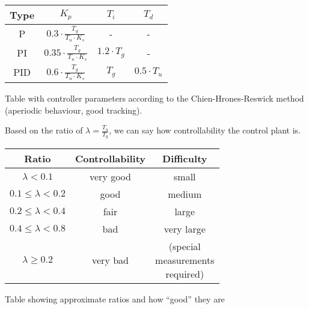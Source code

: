 \begin{center}
    \begin{threeparttable}
        \begin{tabular}{cccc}
            \toprule
            Type & $K_p$                                    &  $T_{i}$            &  $T_{d}$ \\
            \midrule
            P    &  $0.3   \cdot\frac{T_g}{T_u \cdot K_s}$  &  -                  &  -                  \\
            PI   &  $0.35  \cdot\frac{T_g}{T_u \cdot K_s}$  &  $1.2 \cdot T_g$    &  -                  \\
            PID  &  $0.6   \cdot\frac{T_g}{T_u \cdot K_s}$  &  $T_g$              &  $0.5 \cdot T_u$    \\
            \bottomrule
        \end{tabular}
        \caption{Table with controller parameters according to the Chien-Hrones-Reswick method (aperiodic behaviour, good tracking).}
        \label{tab:CHR_tracking}
    \end{threeparttable}
\end{center}

Based  on  the  ratio   of   $\lambda=\frac{T_{u}}{T_{g}}$,  we  can  say  how
controllability the control plant is.

\begin{center}
    \begin{threeparttable}
        \begin{tabular}{ccc}
            \toprule
            Ratio                     &  Controllability  & Difficulty \\
            \midrule
            $\lambda < 0.1$           &  very good        & small  \\ 
            $0.1 \leq \lambda < 0.2$  &  good             & medium  \\ 
            $0.2 \leq \lambda < 0.4$  &  fair             & large  \\ 
            $0.4 \leq \lambda < 0.8$  &  bad              & very large  \\ 
            $ \lambda \geq 0.2$       &  very bad         & \makecell{(special \\ measurements \\ required)}  \\ 
            \bottomrule
        \end{tabular}
        \caption{Table showing approximate ratios and how ``good'' they are}
        \label{tab:controllability}
    \end{threeparttable}
\end{center}

